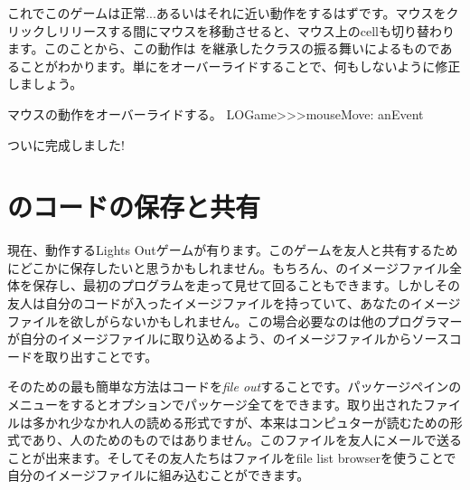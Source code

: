 \documentclass[a4paper,10pt,twoside]{book}
\begin{document}


これでこのゲームは正常...あるいはそれに近い動作をするはずです。マウスをクリックしリリースする間にマウスを移動させると、マウス上のcellも切り替わります。このことから、この動作は  を継承したクラスの振る舞いによるものであることがわかります。単にをオーバーライドすることで、何もしないように修正しましょう。

\begin{method}[mouseMove:]{マウスの動作をオーバーライドする。}
LOGame>>>mouseMove: anEvent
\end{method}

ついに完成しました!


\section{\st{}のコードの保存と共有}

現在、動作するLights Outゲームが有ります。このゲームを友人と共有するためにどこかに保存したいと思うかもしれません。もちろん、\pharo{}のイメージファイル全体を保存し、最初のプログラムを走って見せて回ることもできます。しかしその友人は自分のコードが入ったイメージファイルを持っていて、あなたのイメージファイルを欲しがらないかもしれません。この場合必要なのは他のプログラマーが自分のイメージファイルに取り込めるよう、\pharo{}のイメージファイルからソースコードを取り出すことです。

そのための最も簡単な方法はコードを\emph{file out}することです。パッケージペインのメニューを\actclick{}するとオプションでパッケージ全てをできます。取り出されたファイルは多かれ少なかれ人の読める形式ですが、本来はコンピュターが読むための形式であり、人のためのものではありません。このファイルを友人にメールで送ることが出来ます。そしてその友人たちはファイルをfile list browserを使うことで自分の\pharo{}イメージファイルに組み込むことができます。
\end{document}
